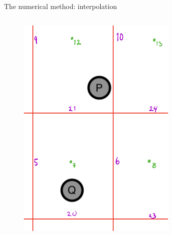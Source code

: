 \documentclass{beamer}
\begin{document}
\begin{frame}{The numerical method: interpolation}
\begin{columns}
                \begin{figure}
                    \includegraphics[scale=0.3]{interpolation.png}
                \end{figure}
        \end{columns}
    \end{frame}
\end{document}
